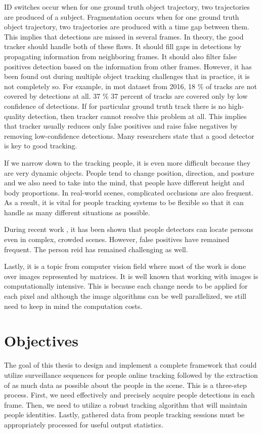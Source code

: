 \begin{introduction}
        ID switches occur when for one ground truth object trajectory, two trajectories are produced of a subject. Fragmentation occurs when for one ground truth object trajectory, two trajectories are produced with a time gap between them. This implies that detections are missed in several frames. In theory, the good tracker should handle both of these flaws. It should fill gaps in detections by propagating information from neighboring frames. It should also filter false positives detection based on the information from other frames. However, it has been found out during multiple object tracking challenges that in practice, it is not completely so. For example, in \gls{mot} \cite{mot16} dataset from 2016, 18 \% of tracks are not covered by detections at all. 37 \% 37 percent of tracks are covered only by low confidence of detections. If for particular ground truth track there is no high-quality detection, then tracker cannot resolve this problem at all. This implies that tracker usually reduces only false positives and raise false negatives by removing low-confidence detections. Many researchers state that a good detector is key to good tracking. \cite{konushin2017}
        
        If we narrow down to the tracking people, it is even more difficult because they are very dynamic objects. People tend to change position, direction, and posture and we also need to take into the mind, that people have different height and body proportions. In real-world scenes, complicated occlusions are also frequent. As a result, it is vital for people tracking systems to be flexible so that it can handle as many different situations as possible. 
        
        During recent work \cite{mot16, luo2014multiple, fan2016survey}, it has been shown that people detectors can locate persons even in complex, crowded scenes. However,  false positives have remained frequent. The person \gls{reid} has remained challenging as well.
        
        Lastly, it is a topic from computer vision field where most of the work is done over images represented by matrices. It is well known that working with images is computationally intensive. This is because each change needs to be applied for each pixel and although the image algorithms can be well parallelized, we still need to keep in mind the computation costs. 
    
    \section{Objectives}
        The goal of this thesis to design and implement a complete framework that could utilize surveillance sequences for people online tracking followed by the extraction of as much data as possible about the people in the scene. This is a three-step process. First, we need effectively and precisely acquire people detections in each frame. Then, we need to utilize a robust tracking algorithm that will maintain people identities. Lastly, gathered data from people tracking sessions must be appropriately processed for useful output statistics.
    

\end{introduction}
